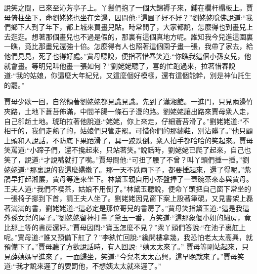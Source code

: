 \begin{parag}
    說笑之間，已來至沁芳亭子上。丫鬟們抱了一個大錦褥子來，鋪在欄杆榻板上。賈母倚柱坐下，命劉姥姥也坐在旁邊，因問他:“這園子好不好？”劉姥姥唸佛說道:“我們鄉下人到了年下，都上城來買畫兒貼。時常閒了，大家都說，怎麼得也到畫兒上去逛逛。想著那個畫兒也不過是假的，那裏有這個真地方呢。誰知我今兒進這園裏一瞧，竟比那畫兒還強十倍。怎麼得有人也照著這個園子畫一張，我帶了家去，給他們見見，死了也得好處。”賈母聽說，便指著惜春笑道:“你瞧我這個小孫女兒，他就會畫。等明兒叫他畫一張如何？”劉姥姥聽了，喜的忙跑過來，拉著惜春說道:“我的姑娘，你這麼大年紀兒，又這麼個好模樣，還有這個能幹，別是神仙託生的罷。”
\end{parag}


\begin{parag}
    賈母少歇一回，自然領著劉姥姥都見識見識。先到了瀟湘館。一進門，只見兩邊竹夾路，土地下蒼苔佈滿，中間羊腸一條石子漫的路。劉姥姥讓出路來賈母衆人走，自己卻赾土地。琥珀拉著他說道:“姥姥，你上來走，仔細蒼苔滑了。”劉姥姥道:“不相干的，我們走熟了的，姑娘們只管走罷。可惜你們的那繡鞋，別沾髒了。”他只顧上頭和人說話，不防底下果跴滑了，具一跤跌倒。衆人拍手都哈哈的笑起來。賈母笑罵道:“小蹄子們，還不攙起來，只站著笑。”說話時，劉姥姥已爬了起來，自己也笑了，說道:“才說嘴就打了嘴。”賈母問他:“可扭了腰了不曾？叫丫頭們捶一捶。”劉姥姥道:“那裏說的我這麼嬌嫩了。那一天不跌兩下子，都要捶起來，還了得呢。”紫鵑早打起湘簾，賈母等進來坐下。林黛玉親自用小茶盤捧了一蓋碗茶來奉與賈母。王夫人道:“我們不喫茶，姑娘不用倒了。”林黛玉聽說，便命丫頭把自己窗下常坐的一張椅子挪到下首，請王夫人坐了。劉姥姥因見窗下案上設著筆硯，又見書架上磊著滿滿的書，劉姥姥道:“這必定是那位哥兒的書房了。”賈母笑指黛玉道:“這是我這外孫女兒的屋子。”劉姥姥留神打量了黛玉一番，方笑道:“這那象個小姐的繡房，竟比那上等的書房還好。”賈母因問:“寶玉怎麼不見？”衆丫頭們答說:“在池子裏舡上呢。”賈母道:“誰又預備下舡了？”李紈忙回說:“纔開樓拿幾，我恐怕老太太高興，就預備下了。”賈母聽了方欲說話時，有人回說: “姨太太來了。” 賈母等剛站起來，只見薛姨媽早進來了，一面歸坐，笑道:“今兒老太太高興，這早晚就來了。”賈母笑道:“我才說來遲了的要罰他，不想姨太太就來遲了。”
\end{parag}


